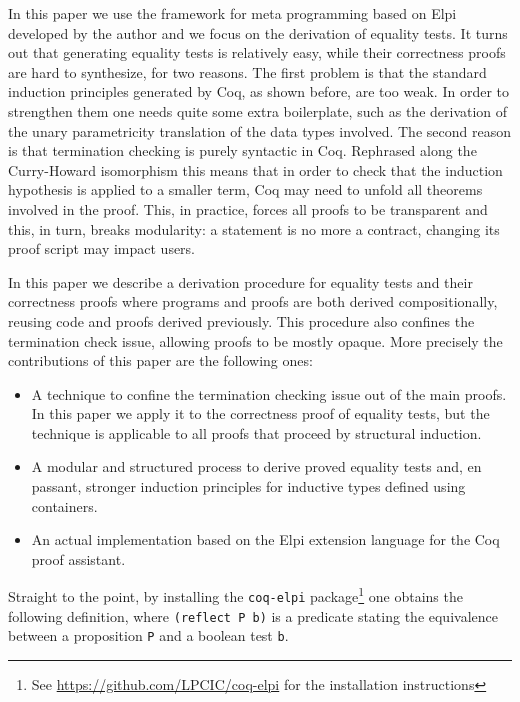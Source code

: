 \documentclass[sigplan,10pt,review]{acmart}\settopmatter{printfolios=true,printccs=false,printacmref=false}
\begin{document}
In this paper we use the framework for meta programming based on
Elpi~\cite{dunchev:hal-01176856,tassi:hal-01637063} developed by the
author and we focus on the derivation of equality tests.
It turns out that generating equality tests is relatively easy,
while their correctness proofs are hard to synthesize, for two reasons. 
The first problem is that 
the standard induction principles generated by Coq, as shown
before, are too weak. In order to strengthen them one needs quite some extra
boilerplate, such as the derivation of the unary parametricity
translation of the data types involved.
The second reason is that termination checking
is purely syntactic in Coq. Rephrased along the Curry-Howard
isomorphism this means that in order to check that the induction
hypothesis is applied to a smaller term, Coq may need to unfold all
theorems involved in the proof. This, in practice, forces all proofs to
be transparent and this, in turn, breaks modularity: a statement is no more a
contract, changing its proof script may impact users.

In this paper we describe a derivation procedure for equality tests
and their correctness proofs
where programs and proofs are both
derived compositionally, reusing code and proofs derived previously.
This procedure also confines the termination check issue,
allowing proofs to be mostly opaque.
More precisely the contributions of this paper are the following ones:
\begin{itemize}
\item A technique to confine the termination checking issue out of the
	main proofs. In this paper we apply it to the correctness
	proof of equality
	tests, but the technique is applicable to all proofs 
	that proceed by structural
	induction.

\item A modular and structured process to derive proved equality tests
		and, en passant, stronger
	induction principles for inductive types defined using
	containers.

\item An actual implementation based on the Elpi extension language
	for the Coq proof assistant.
\end{itemize}

\noindent
Straight to the point, by installing the \lstinline+coq-elpi+
package\footnote{See \url{https://github.com/LPCIC/coq-elpi} for the
installation instructions} 
one obtains the following definition, where \lstinline+(reflect P b)+
is a predicate stating the equivalence between a proposition
\lstinline+P+ and a boolean test \lstinline+b+.
\end{document}
